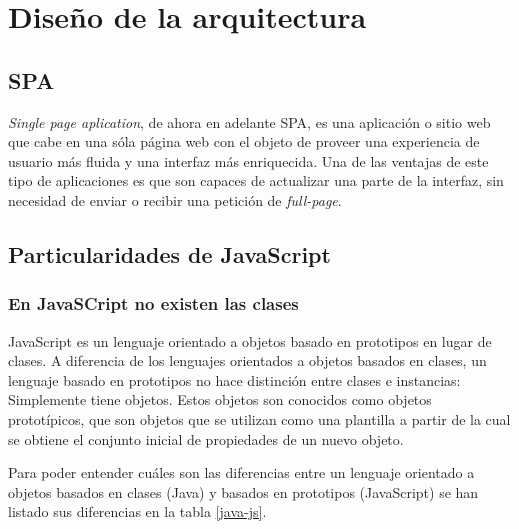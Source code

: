 \section{Diseño de la arquitectura}

\subsection{SPA}
\textit{Single page aplication}, de ahora en adelante SPA, es una aplicación o sitio web que cabe en una sóla página web con el objeto de proveer una experiencia de usuario más fluida y una interfaz más enriquecida. Una de las ventajas de este tipo de aplicaciones es que son capaces de actualizar una parte de la interfaz, sin necesidad de enviar o recibir una petición de \textit{full-page}.


\subsection{Particularidades de JavaScript}
\subsubsection{En JavaSCript no existen las clases}
JavaScript es un lenguaje orientado a objetos basado en prototipos en lugar de clases. A diferencia de los lenguajes orientados a objetos basados en clases, un lenguaje basado en prototipos no hace distinción entre clases e instancias: Simplemente tiene objetos. Estos objetos son conocidos como objetos prototípicos, que son objetos que se utilizan como una plantilla a partir de la cual se obtiene el conjunto inicial de propiedades de un nuevo objeto\cite{fernandomonteiro2014}.


Para poder entender cuáles son las diferencias entre un lenguaje orientado a objetos basados en clases (Java) y basados en prototipos (JavaScript) se han listado sus diferencias en la tabla \ref{java-js}.


